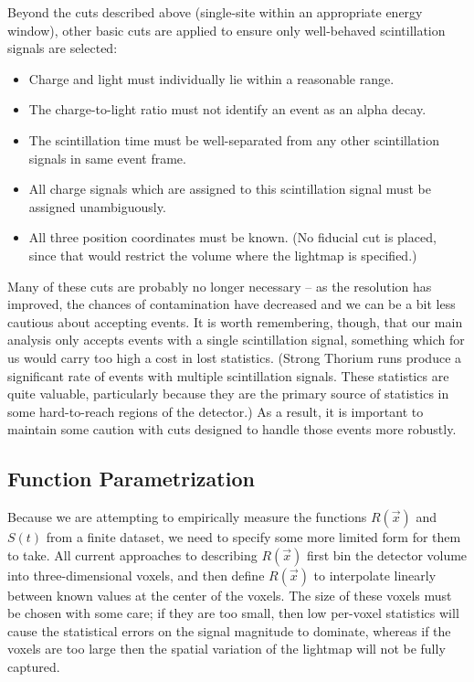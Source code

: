 Beyond the cuts described above (single-site within an appropriate energy window), other basic cuts are applied to ensure only well-behaved scintillation signals are selected:
\begin{itemize}
\item Charge and light must individually lie within a reasonable range.
\item The charge-to-light ratio must not identify an event as an alpha decay.
\item The scintillation time must be well-separated from any other scintillation signals in same event frame.
\item All charge signals which are assigned to this scintillation signal must be assigned unambiguously.
\item All three position coordinates must be known.  (No fiducial cut is placed, since that would restrict the volume where the lightmap is specified.)
\end{itemize}
Many of these cuts are probably no longer necessary -- as the resolution has improved, the chances of contamination have decreased and we can be a bit less cautious about accepting events.  It is worth remembering, though, that our main analysis only accepts events with a single scintillation signal, something which for us would carry too high a cost in lost statistics.  (Strong Thorium runs produce a significant rate of events with multiple scintillation signals.  These statistics are quite valuable, particularly because they are the primary source of statistics in some hard-to-reach regions of the detector.)  As a result, it is important to maintain some caution with cuts designed to handle those events more robustly.

\subsection{Function Parametrization} \label{sec:LightmapFunctionParametrization}

Because we are attempting to empirically measure the functions $R(\vec{x})$ and $S(t)$ from a finite dataset, we need to specify some more limited form for them to take.  All current approaches to describing $R(\vec{x})$ first bin the detector volume into three-dimensional voxels, and then define $R(\vec{x})$ to interpolate linearly between known values at the center of the voxels.  The size of these voxels must be chosen with some care; if they are too small, then low per-voxel statistics will cause the statistical errors on the signal magnitude to dominate, whereas if the voxels are too large then the spatial variation of the lightmap will not be fully captured.

